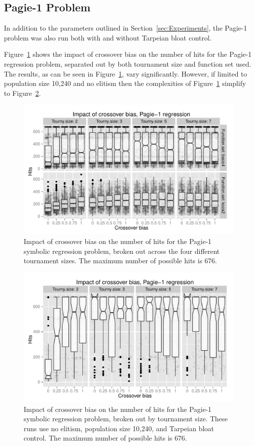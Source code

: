 \documentclass{sig-alternate}
\begin{document}
\subsection{Pagie-1 Problem}

In addition to the parameters outlined in Section~\ref{sec:Experiments}, the Pagie-1 problem was 
also run both with and without Tarpeian bloat control.

Figure~\ref{fig:Pagie1Hits_Bias_Tournys_FunctionSet} shows the impact of crossover bias on the number of hits for the
Pagie-1 regression problem, separated out by both tournament size and function set used. The results, as 
can be seen in Figure~\ref{fig:Pagie1Hits_Bias_Tournys_FunctionSet}, vary significantly. However, if limited 
to population size 10,240 and no elitism then the complexities of 
Figure~\ref{fig:Pagie1Hits_Bias_Tournys_FunctionSet} simplify to
Figure~\ref{fig:Pagie1StrongHits_Bias_Tournys_FunctionSet}.

\begin{figure}
\centering
\includegraphics[width=0.45 \textwidth]{Plots/Pagie_1_Hits_vs_Bias_Tournys_FunctionSet.pdf}
\caption{Impact of crossover bias on the number of hits for the Pagie-1 symbolic regression problem, 
	broken out across the four different tournament sizes. The maximum number of possible hits is 676.}
\label{fig:Pagie1Hits_Bias_Tournys_FunctionSet}
\end{figure}

\begin{figure}
\centering
\includegraphics[width=0.45 \textwidth]{Plots/Pagie_1_strong_Hits_vs_Bias_Tournys_FunctionSet.pdf}
\caption{Impact of crossover bias on the number of hits for the Pagie-1 symbolic regression problem, 
	broken out by tournament size. These runs use no elitism, 
	population size 10,240, and Tarpeian bloat control. 
	The maximum number of possible hits is 676.}
\label{fig:Pagie1StrongHits_Bias_Tournys_FunctionSet}
\end{figure}
\end{document}
